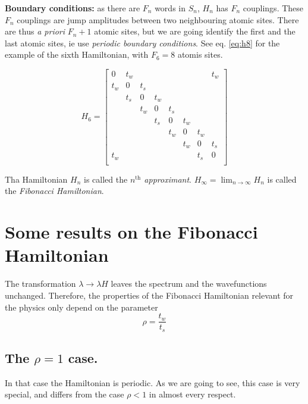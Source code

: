 \documentclass[11pt]{article}
\numberwithin{equation}{section}
\begin{document}
\textbf{Boundary conditions:} as there are $F_n$ words in $S_n$, $H_n$ has $F_n$ couplings. These $F_n$ couplings are jump amplitudes between two neighbouring atomic sites. There are thus \textit{a priori} $F_n + 1$ atomic sites, but we are going identify the first and the last atomic sites, ie use \textit{periodic boundary conditions}.
See eq. \eqref{eq:h8} for the example of the sixth Hamiltonian, with $F_6 = 8$ atomis sites.

\begin{equation}
\label{eq:h8} 
	H_6 = 
	\begin{bmatrix}
	0 & t_w &   &   &   &   &   & t_w\\
	t_w & 0 & t_s &   &   &   &   &  \\
	  & t_s & 0 & t_w &   &   &   &  \\
	  &   & t_w & 0 & t_s &   &   &  \\
	  &   &   & t_s & 0 & t_w &   &  \\
	  &   &   &   & t_w & 0 & t_w &  \\
	  &   &   &   &   & t_w & 0 & t_s\\
	t_w &   &   &   &   &   & t_s & 0\\
\end{bmatrix}
\end{equation}

Tha Hamiltonian $H_n$ is called the \textit{$n^\text{th}$ approximant}. $H_\infty = \lim_{n \rightarrow \infty} H_n$ is called the \textit{Fibonacci Hamiltonian}.

\section{Some results on the Fibonacci Hamiltonian}

The transformation $\lambda \rightarrow \lambda H$ leaves the spectrum and the wavefunctions unchanged.
Therefore, the properties of the Fibonacci Hamiltonian relevant for the physics only depend on the parameter
\begin{equation}
	\rho = \frac{t_w}{t_s}
\end{equation}

\subsection{The $\rho = 1$ case.}

In that case the Hamiltonian is periodic. As we are going to see, this case is very special, and differs from the case $\rho < 1$ in almost every respect.
\end{document}
